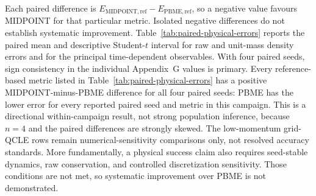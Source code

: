 Each paired difference is
\(E_{\mathrm{MIDPOINT,ref}}-E_{\mathrm{PBME,ref}}\), so a negative value
favours MIDPOINT for that particular metric. Isolated negative differences do
not establish systematic improvement. Table~\ref{tab:paired-physical-errors}
reports the paired mean and descriptive Student-\(t\) interval for raw and
unit-mass density errors and for the principal time-dependent observables.
With four paired seeds, sign consistency in the individual Appendix~G values
is primary. Every reference-based metric listed in
Table~\ref{tab:paired-physical-errors} has a positive MIDPOINT-minus-PBME
difference for all four paired seeds: PBME has the lower error for every reported paired seed and metric
in this campaign. This is a directional
within-campaign result, not strong population inference, because \(n=4\) and
the paired differences are strongly skewed. The low-momentum grid-QCLE rows
remain numerical-sensitivity comparisons only, not resolved accuracy
standards. More fundamentally, a physical success claim also requires
seed-stable dynamics, raw conservation, and controlled discretization
sensitivity. Those conditions are not met, so systematic improvement over
PBME is not demonstrated.

